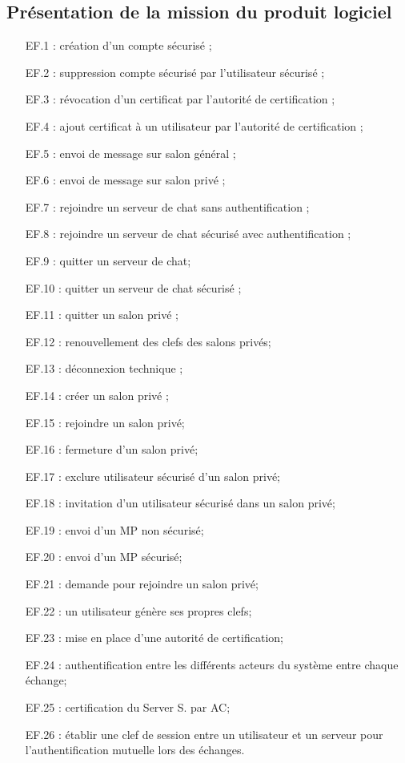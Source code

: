 \documentclass[a4paper,11pt,french]{article}
\begin{document}
\subsection{Présentation de la mission du produit logiciel}
\begin{itemize}
\item [EF.1] : création d'un compte sécurisé ;
\item [EF.2] : suppression compte sécurisé par l'utilisateur sécurisé ;
\item [EF.3] : révocation d'un certificat par l'autorité de certification ;
\item [EF.4] : ajout certificat à un utilisateur par l'autorité de certification ;
\item [EF.5] : envoi de message sur salon général ;
\item [EF.6] : envoi de message sur salon privé ;
\item [EF.7] : rejoindre un serveur de chat sans authentification ;
\item [EF.8] : rejoindre un serveur de chat sécurisé avec authentification ;
\item [EF.9] : quitter un serveur de chat;
\item [EF.10] : quitter un serveur de chat sécurisé ;
\item [EF.11] : quitter un salon privé ;
\item [EF.12] : renouvellement des clefs des salons privés;
\item [EF.13] : déconnexion technique ;
\item [EF.14] : créer un salon privé ;
\item [EF.15] : rejoindre un salon privé;
\item [EF.16] : fermeture d'un salon privé;
\item [EF.17] : exclure utilisateur sécurisé d'un salon privé;
\item [EF.18] : invitation d'un utilisateur sécurisé dans un salon privé;
\item [EF.19] : envoi d'un MP non sécurisé;
\item [EF.20] : envoi d'un MP sécurisé;
\item [EF.21] : demande pour rejoindre un salon privé;
\item [EF.22] : un utilisateur génère ses propres clefs;
\item [EF.23] : mise en place d'une autorité de certification;
\item [EF.24] : authentification entre les différents acteurs du système entre chaque échange;
\item [EF.25] : certification du Server S. par AC;
\item [EF.26] : établir une clef de session entre un utilisateur et un serveur pour l'authentification mutuelle lors des échanges.
\end{itemize}
\end{document}
